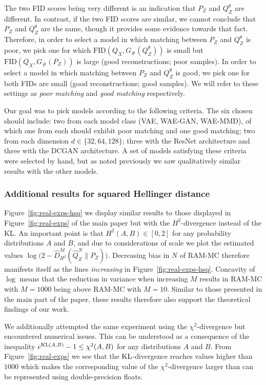 The two FID scores being very different is an indication that $P_Z$ and $Q^\theta_Z$ are different.
In contrast, if the two FID scores are similar, we cannot conclude that $P_Z$ and $Q^\theta_Z$ are the same, though it provides some evidence towards that fact.
Therefore, in order to select a model in which matching between $P_Z$ and $Q^\theta_Z$ is poor, we pick one for which $\text{FID}\left(Q_X, G_\#(Q^\theta_Z)\right)$ is small but $\text{FID}\left(Q_X, G_\#(P_Z)\right)$ is large (good reconstructions; poor samples).
In order to select a model in which matching between $P_Z$ and $Q^\theta_Z$ is good, we pick one for both FIDs are small (good reconstructions; good samples). 
We will refer to these settings as \emph{poor matching} and \emph{good matching} respectively.

Our goal was to pick models according to the following criteria. 
The six chosen should include: two from each model class (VAE, WAE-GAN, WAE-MMD), of which one from each should exhibit poor matching and one good matching; two from each dimension $d\in\{32, 64, 128\}$; three with the ResNet architecture and three with the DCGAN architecture.
A set of models satisfying these criteria were selected by hand, but as noted previously we saw qualitatively similar results with the other models.

\subsubsection{Additional results for squared Hellinger distance}\label{appendix:sq-hellinger-results}

Figure~\ref{fig:real-exps-hsq} we display similar results to those displayed in Figure~\ref{fig:real-exps} of the main paper but with the $H^2$-divergence instead of the KL.
An important point is that $H^2(A,B) \in [0, 2]$ for any probability distributions $A$ and $B$,
and due to considerations of scale we plot the estimated values $\log\big(2 - \hat{D}^M_{H^2}(\hat{Q}^N_Z \| P_Z)\big)$.
Decreasing bias in $N$ of RAM-MC therefore manifests itself as the lines \emph{increasing} in Figure~\ref{fig:real-exps-hsq}. 
Concavity of $\log$ means that the reduction in variance when increasing $M$ results in RAM-MC with $M{=}1000$ being above RAM-MC with $M{=}10$.
Similar to those presented in the main part of the paper, these results therefore also support the theoretical findings of our work.

We additionally attempted the same experiment using the $\chi^2$-divergence but encountered numerical issues.
This can be understood as a consequence of the inequality $e^{\mathrm{KL}(A, B)} - 1 \leq \chi^2(A,B)$ for any distributions $A$ and $B$. 
From Figure~\ref{fig:real-exps} we see that the $\mathrm{KL}$-divergence reaches values higher than $1000$ which makes the corresponding value of the $\chi^2$-divergence larger than can be represented using double-precision floats.

